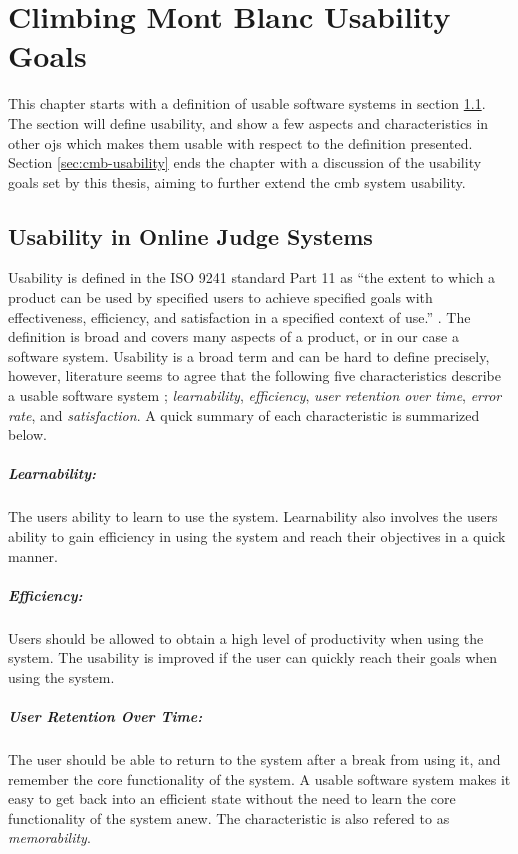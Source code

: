 \chapter{Climbing Mont Blanc Usability Goals}
\label{ch:design}
This chapter starts with a definition of usable software systems in section \ref{sec:usability-def}. The section will define usability, and show a few aspects and characteristics in other \glspl{oj} which makes them usable with respect to the definition presented. Section \ref{sec:cmb-usability} ends the chapter with a discussion of the usability goals set by this thesis, aiming to further extend the \gls{cmb} system usability.

\section{Usability in Online Judge Systems}
\label{sec:usability-def}
Usability is defined in the ISO 9241 standard Part 11 as ``the extent to which a product can be used by specified users to achieve specified goals with effectiveness, efficiency, and satisfaction in a specified context of use.'' \cite{ISO1998}. The definition is broad and covers many aspects of a product, or in our case a software system. Usability is a broad term and can be hard to define precisely, however, literature seems to agree that the following five characteristics describe a usable software system  \cite{holzinger2005, ferre2001}; \textit{learnability}, \textit{efficiency}, \textit{user retention over time}, \textit{error rate}, and \textit{satisfaction}. A quick summary of each characteristic is summarized below.

\paragraph*{Learnability:} The users ability to learn to use the system. Learnability also involves the users ability to gain efficiency in using the system and reach their objectives in a quick manner.

\paragraph*{Efficiency:} Users should be allowed to obtain a high level of productivity when using the system. The usability is improved if the user can quickly reach their goals when using the system.

\paragraph*{User Retention Over Time:} The user should be able to return to the system after a break from using it, and remember the core functionality of the system. A usable software system makes it easy to get back into an efficient state without the need to learn the core functionality of the system anew. The characteristic is also refered to as \textit{memorability}.

